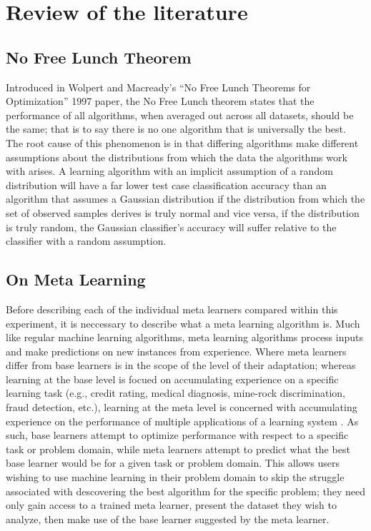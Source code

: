 \chapter{Review of the literature}
\label{Chapter2}
\section{No Free Lunch Theorem}
Introduced in Wolpert and Macready's ``No Free Lunch Theorems for Optimization''
1997 paper, the No Free Lunch theorem states that the performance of all
algorithms, when averaged out across all datasets, should be the same; that is
to say there is no one algorithm that is universally the best. The root cause of
this phenomenon is in that differing algorithms make different assumptions
about the distributions from which the data the algorithms work with arises. A
learning algorithm with an implicit assumption of a random distribution will
have a far lower test case classification accuracy than an algorithm that
assumes a Gaussian distribution if the distribution from which the set of
observed samples derives is truly normal and vice versa, if the
distribution is truly random, the Gaussian classifier's accuracy will suffer
relative to the classifier with a random assumption.
\section{On Meta Learning}
Before describing each of the individual meta learners compared within this
experiment, it is neccessary to describe what a meta learning algorithm is.
Much like regular machine learning algorithms, meta learning algorithms process
inputs and make predictions on new instances from experience. Where meta learners
differ from base learners is in the scope of the level of their adaptation; whereas
learning at the base level is focued on accumulating experience on a specific
learning task (e.g., credit rating, medical diagnosis, mine-rock discrimination,
fraud detection, etc.), learning at the meta level is concerned with accumulating
experience on the performance of multiple applications of a learning system
\cite{Vilalta}. As such, base learners attempt to optimize performance with
respect to a specific task or problem domain, while meta learners attempt to
predict what the best base learner would be for a given task or problem domain.
This allows users wishing to use machine learning in their problem domain to skip
the struggle associated with descovering the best algorithm for the specific
problem; they need only gain access to a trained meta learner, present the dataset
they wish to analyze, then make use of the base learner suggested by the meta
learner.

